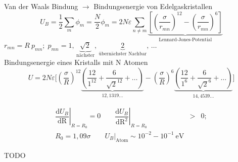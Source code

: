 \nr
Van der Waals Bindung $\to$ Bindungsenergie von Edelgaskristallen
\[
U_B=\dfrac{1}{2}\sum_{m}\phi_{m}=\dfrac{N}{2}\phi_{m}=2N\varepsilon \sum_{n\neq m} \underbrace{ \left[ \left(\dfrac{\sigma}{r_{m n}}\right)^{12} - \left(\dfrac{\sigma}{r_{m n}}\right)^{6} \right] }_{\text{Lennard-Jones-Potential} }
\] 
$r_{m n }=R\ p_{m n};\; p_{m n}=1,\, \underbrace{\sqrt{2}}_{\text{n\"achster}},\, \underbrace{2}_{\text{\"ubern\"achster Nachbar}},\, \ldots$
\\
Bindungsenergie eines Kristalls mit N Atomen
\[
U = 2N\varepsilon \Bigg[ \left( \dfrac{\sigma}{R} \right)^{12} \underbrace{ \left( \dfrac{12}{1^{12}} + \dfrac{6}{\sqrt{2}^{12}} + \ldots \right) }_{12,1319\ldots} - \left( \dfrac{\sigma}{R} \right)^{6} \underbrace{ \left( \dfrac{12}{1^{6}} + \dfrac{6}{\sqrt{2}^{6}} + \ldots \right) }_{14,4539\ldots} \Bigg]
\]

\begin{eqnarray*}
\left.\dfrac{\text{d}U_{B}}{\text{dR}} \right|_{R=R_{0}}  =  0 \qquad
 \left.\dfrac{\text{d}U_{B}}{\text{dR}^{2}} \right|_{R=R_{0}} & > & 0; \\
R_{0}  =  1,09 \sigma \qquad
\left. U_{B} \right|_{\text{Atom}}   \sim 10^{-2} - 10^{-1}~\text{eV}
\end{eqnarray*}

TODO